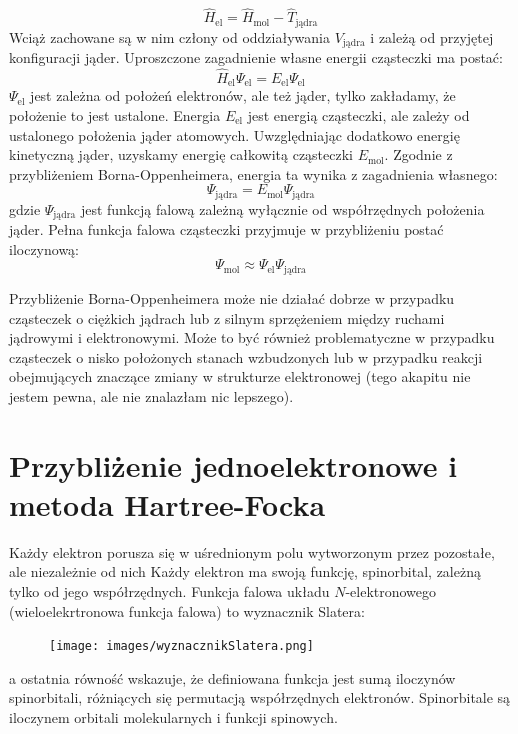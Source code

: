 \documentclass{article}
\begin{document}
\begin{equation*}
    \hat{H}_\text{el}=\hat{H}_\text{mol} - \hat{T}_\text{jądra}
\end{equation*}
Wciąż zachowane są w nim człony od oddziaływania $V_\text{jądra}$ i zależą od przyjętej konfiguracji jąder.  Uproszczone zagadnienie własne energii cząsteczki ma postać:
\begin{equation*}
    \hat{H}_\text{el}\Psi_\text{el}=E_\text{el}\Psi_\text{el}
\end{equation*}
$\Psi_\text{el}$ jest zależna od położeń elektronów, ale też jąder, tylko zakładamy, że położenie to jest ustalone. Energia $E_\text{el}$ jest energią cząsteczki, ale zależy od ustalonego położenia jąder atomowych. Uwzględniając dodatkowo energię kinetyczną jąder, uzyskamy energię całkowitą cząsteczki $E_\text{mol}$. Zgodnie z przybliżeniem Borna-Oppenheimera, energia ta wynika z zagadnienia własnego:
\begin{equation*}
   [\hat{T}_\text{jądra} + E_\text{el}]\Psi_\text{jądra}=E_\text{mol}\Psi_\text{jądra}
\end{equation*}
gdzie $\Psi_\text{jądra}$ jest funkcją falową zależną wyłącznie od współrzędnych położenia jąder. Pełna funkcja falowa cząsteczki przyjmuje w przybliżeniu postać iloczynową:
\begin{equation*}
   \Psi_\text{mol} \approx \Psi_\text{el}\Psi_\text{jądra}
\end{equation*}

Przybliżenie Borna-Oppenheimera może nie działać dobrze w przypadku cząsteczek o ciężkich jądrach lub z silnym sprzężeniem między ruchami jądrowymi i elektronowymi. Może to być również problematyczne w przypadku cząsteczek o nisko położonych stanach wzbudzonych lub w przypadku reakcji obejmujących znaczące zmiany w strukturze elektronowej (tego akapitu nie jestem pewna, ale nie znalazłam nic lepszego).
\section{Przybliżenie jednoelektronowe i metoda Hartree-Focka}
Każdy elektron porusza się w uśrednionym polu wytworzonym przez pozostałe, ale niezależnie od nich
Każdy elektron ma swoją funkcję, spinorbital, zależną tylko od jego współrzędnych. 
Funkcja falowa układu $N$-elektronowego (wieloelekrtronowa funkcja falowa) to wyznacznik Slatera:
\begin{figure}[H]
    \centering
    \texttt{[image: images/wyznacznikSlatera.png]}
\end{figure}
a ostatnia równość wskazuje, że definiowana funkcja jest sumą iloczynów spinorbitali, różniących się permutacją współrzędnych elektronów. Spinorbitale są iloczynem orbitali molekularnych i funkcji spinowych.
\end{document}
